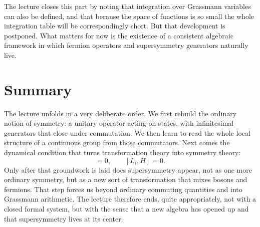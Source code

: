 The lecture closes this part by noting that integration over Grassmann variables can also be defined, and that because the space of functions is so small the whole integration table will be correspondingly short. But that development is postponed. What matters for now is the existence of a consistent algebraic framework in which fermion operators and supersymmetry generators naturally live.

\section{Summary}

The lecture unfolds in a very deliberate order. We first rebuild the ordinary notion of symmetry: a unitary operator acting on states, with infinitesimal generators that close under commutation. We then learn to read the whole local structure of a continuous group from those commutators. Next comes the dynamical condition that turns transformation theory into symmetry theory:
\begin{equation}
[U,H]=0,
\qquad
[L_i,H]=0.
\end{equation}
Only after that groundwork is laid does supersymmetry appear, not as one more ordinary symmetry, but as a new sort of transformation that mixes bosons and fermions. That step forces us beyond ordinary commuting quantities and into Grassmann arithmetic. The lecture therefore ends, quite appropriately, not with a closed formal system, but with the sense that a new algebra has opened up and that supersymmetry lives at its center.